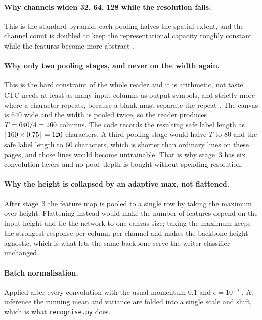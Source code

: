 \documentclass[11pt,a4paper]{article}
\begin{document}
\paragraph{Why channels widen 32, 64, 128 while the resolution falls.}
This is the standard pyramid: each pooling halves the spatial extent, and the
channel count is doubled to keep the representational capacity roughly constant
while the features become more abstract \cite{lecun1998,shi2017}.

\paragraph{Why only two pooling stages, and never on the width again.}
This is the hard constraint of the whole reader and it is arithmetic, not taste.
CTC needs at least as many input columns as output symbols, and strictly more
where a character repeats, because a blank must separate the repeat
\cite[pp.~370--372]{graves2006}. The canvas is $640$ wide and the width is
pooled twice, so the reader produces $T = 640/4 = 160{}$ columns. The
code records the resulting safe label length as
$\lfloor 160 \times 0.75 \rfloor = 120{}$ characters. A third
pooling stage would halve $T$ to $80$ and the safe label length to $60$
characters, which is shorter than ordinary lines on these pages, and those lines
would become untrainable. That is why stage~3 has six convolution layers and no
pool: depth is bought without spending resolution.

\paragraph{Why the height is collapsed by an adaptive max, not flattened.}
After stage~3 the feature map is pooled to a single row by taking the maximum
over height. Flattening instead would make the number of features depend on the
input height and tie the network to one canvas size; taking the maximum keeps
the strongest response per column per channel and makes the backbone
height-agnostic, which is what lets the same backbone serve the writer
classifier unchanged.

\paragraph{Batch normalisation.} Applied after every convolution with the usual
momentum $0.1$ and $\epsilon = 10^{-5}$ \cite[Alg.~1]{ioffe2015}. At inference
the running mean and variance are folded into a single scale and shift, which is
what \texttt{recognise.py} does.
\end{document}
